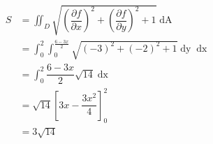 \documentclass[runningheads]{llncs}
\begin{document}
\begin{align*}
	S &= \iint_D \sqrt{\left(\dfrac{\partial f}{\partial x}\right)^2 + \left(\dfrac{\partial f}{\partial y}\right)^2 + 1} \mathop{dA}\\
	&= \int_0^2 \int_0^\frac{6-3x}{2} \sqrt{\left(-3\right)^2 + \left(-2\right)^2 + 1} \mathop{dy} \mathop{dx}\\
	&= \int_0^2 \dfrac{6-3x}{2} \sqrt{14} \mathop{dx}\\
	&= \sqrt{14}\left[ 3x-\dfrac{3x^2}{4}\right]^2_0\\
	&= 3\sqrt{14}
\end{align*}
\end{document}
